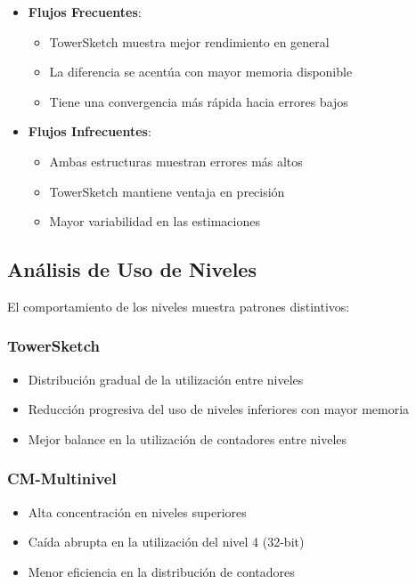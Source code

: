 \documentclass[a4paper,12pt]{article}
\begin{document}
\begin{itemize}
    \item \textbf{Flujos Frecuentes}:
    \begin{itemize}
        \item TowerSketch muestra mejor rendimiento en general
        \item La diferencia se acentúa con mayor memoria disponible
        \item Tiene una convergencia más rápida hacia errores bajos
    \end{itemize}
    
    \item \textbf{Flujos Infrecuentes}:
    \begin{itemize}
        \item Ambas estructuras muestran errores más altos
        \item TowerSketch mantiene ventaja en precisión
        \item Mayor variabilidad en las estimaciones
    \end{itemize}
\end{itemize}

\subsection{Análisis de Uso de Niveles}
El comportamiento de los niveles muestra patrones distintivos:

\subsubsection{TowerSketch}
\begin{itemize}
    \item Distribución gradual de la utilización entre niveles
    \item Reducción progresiva del uso de niveles inferiores con mayor memoria
    \item Mejor balance en la utilización de contadores entre niveles
\end{itemize}

\subsubsection{CM-Multinivel}
\begin{itemize}
    \item Alta concentración en niveles superiores
    \item Caída abrupta en la utilización del nivel 4 (32-bit)
    \item Menor eficiencia en la distribución de contadores
\end{itemize}
\end{document}
